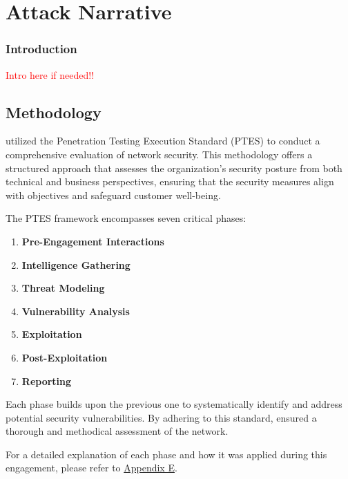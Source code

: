 \section{Attack Narrative}

\subsubsection*{Introduction}
\textcolor{red}{Intro here if needed!!}

\subsection{Methodology}

\team utilized the Penetration Testing Execution Standard (PTES) to conduct a comprehensive evaluation of \clientP network security. This methodology offers a structured approach that assesses the organization's security posture from both technical and business perspectives, ensuring that the security measures align with \clientP objectives and safeguard customer well-being.

The PTES framework encompasses seven critical phases:

\begin{enumerate}
    \item \textbf{Pre-Engagement Interactions}
    \item \textbf{Intelligence Gathering}
    \item \textbf{Threat Modeling}
    \item \textbf{Vulnerability Analysis}
    \item \textbf{Exploitation}
    \item \textbf{Post-Exploitation}
    \item \textbf{Reporting}
\end{enumerate}

Each phase builds upon the previous one to systematically identify and address potential security vulnerabilities. By adhering to this standard, \team ensured a thorough and methodical assessment of the \client network.

For a detailed explanation of each phase and how it was applied during this engagement, please refer to \hyperref[sec:appendixE]{Appendix E}.

\newpage



\